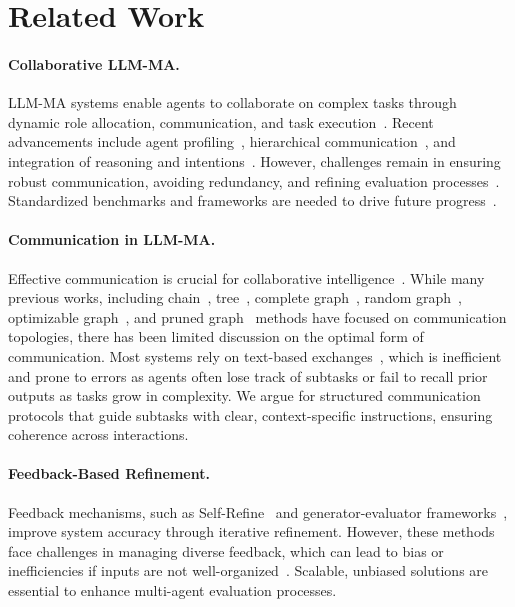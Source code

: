 \section{Related Work}
\label{rw}

\paragraph{Collaborative LLM-MA.}
LLM-MA systems enable agents to collaborate on complex tasks through dynamic role allocation, communication, and task execution~\cite{guo2024large, han2024challenges}. Recent advancements include agent profiling~\cite{yang2024multi}, hierarchical communication~\cite{rasal2024harmony}, and integration of reasoning and intentions~\cite{qiu2024collaborative}. %
However, challenges remain in ensuring robust communication, avoiding redundancy, and refining evaluation processes~\cite{talebirad2023collaboration}. Standardized benchmarks and frameworks are needed to drive future progress~\cite{li2024survey}.

\paragraph{Communication in LLM-MA.}
Effective communication is crucial for collaborative intelligence~\cite{guo2024large}. While many previous works, including chain~\citep{cot}, tree~\citep{tot}, complete graph~\citep{qian2024scaling}, random graph~\citep{qian2024scaling}, optimizable graph~\citep{zhuge2024gptswarm}, and pruned graph~\citep{zhang2024cut} methods have focused on communication topologies, there has been limited discussion on the optimal form of communication. Most systems rely on text-based exchanges~\cite{zhang2024cut, shen2024small}, which is inefficient and prone to errors as agents often lose track of subtasks or fail to recall prior outputs as tasks grow in complexity. We argue for structured communication protocols that guide subtasks with clear, context-specific instructions, ensuring coherence across interactions.

\paragraph{Feedback-Based Refinement.}
Feedback mechanisms, such as Self-Refine~\cite{madaan2023selfrefine} and generator-evaluator frameworks~\cite{wang2023coeval}, improve system accuracy through iterative refinement. However, these methods face challenges in managing diverse feedback, which can lead to bias or inefficiencies if inputs are not well-organized~\cite{xu2024cooperative}. Scalable, unbiased solutions are essential to enhance multi-agent evaluation processes.